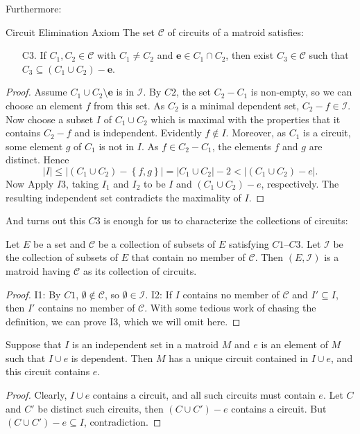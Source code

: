 \documentclass[a4paper,10pt]{article}
\newcommand{\ee}{\mathbf{e}}
\newcommand{\II}{\mathcal{I}}
\newcommand{\CC}{\mathcal{C}}
\begin{document}
Furthermore:
\begin{lemma}[lem:]{Circuit Elimination Axiom}
  The set $\CC$ of circuits of a matroid satisfies:
  \begin{enumerate}
    \item [C3.] If $C_1,C_2\in \CC$ with $C_1\neq C_2$ and $\ee\in C_1\cap C_2$, then exist $C_3\in \CC$ such that $C_3\subseteq (C_1\cup C_2)-\ee$.
  \end{enumerate}
  \begin{proof}
    Assume $C_1\cup C_2\setminus \ee$ is in $\II$. By $C2$, the set $C_2-C_1$ is non-empty, so we can choose an element $f$ from this set. As $C_2$ is a minimal dependent set, $C_2-f\in \II$. Now choose a subset $I$ of $C_1\cup C_2$ which is maximal with the properties that it contains $C_2-f$ and is independent. Evidently $f\notin I$. Moreover, as $C_1$ is a circuit, some element $g$ of $C_1$ is not in $I$. As $f\in C_2-C_1$, the elements $f$ and $g$ are distinct. Hence 
    \[
      |I|\leq |(C_1\cup C_2)-\left\{f,g\right\}|=|C_1\cup C_2|-2<|(C_1\cup C_2)-e|.
    \]
    Now Apply $I3$, taking $I_1$ and $I_2$ to be $I$ and $(C_1\cup C_2)-e$, respectively. The resulting independent set contradicts the maximality of $I$.
  \end{proof}
\end{lemma}

And turns out this $C3$ is enough for us to characterize the collections of circuits:

\begin{theorem}[thm:]{}
  Let $E$ be a set and $\CC$ be a collection of subsets of $E$ satisfying $C1$--$C3$. Let $\II$ be the collection of subsets of $E$ that contain no member of $\CC$. Then $(E,\II)$ is a matroid having $\CC$ as its collection of circuits.
  \begin{proof}
    I1: By $C1$, $\emptyset\notin \CC$, so $\emptyset \in \II$.
    I2: If $I$ contains no member of $\CC$ and $I'\subseteq I$, then $I'$ contains no member of $\CC$. With some tedious work of chasing the definition, we can prove I3, which we will omit here.
  \end{proof}
\end{theorem}

\begin{proposition}[pps:]{}
  Suppose that $I$ is an independent set in a matroid $M$ and $e$ is an element of $M$ such that $I\cup e$ is dependent. Then $M$ has a unique circuit contained in $I\cup e$, and this circuit contains $e$.
  \begin{proof}
    Clearly, $I\cup e$ contains a circuit, and all such circuits must contain $e$. Let $C$ and $C'$ be distinct such circuits, then $(C\cup C')-e$ contains a circuit. But $(C\cup C')-e\subseteq I$, contradiction.
  \end{proof}
\end{proposition}
\end{document}
